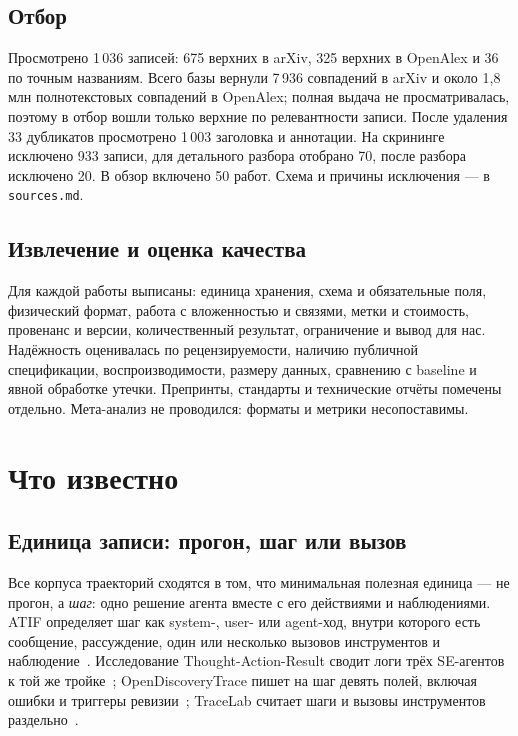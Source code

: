 \documentclass[11pt,a4paper]{article}
\begin{document}
\subsection{Отбор}

Просмотрено 1\,036 записей: 675 верхних в arXiv, 325 верхних в OpenAlex и
36 по точным названиям. Всего базы вернули 7\,936 совпадений в arXiv и
около 1,8 млн полнотекстовых совпадений в OpenAlex; полная выдача не
просматривалась, поэтому в отбор вошли только верхние по релевантности
записи. После удаления 33 дубликатов просмотрено 1\,003 заголовка и
аннотации. На скрининге исключено 933 записи, для детального разбора
отобрано 70, после разбора исключено 20. В обзор включено 50 работ. Схема
и причины исключения — в \texttt{sources.md}.

\subsection{Извлечение и оценка качества}

Для каждой работы выписаны: единица хранения, схема и обязательные поля,
физический формат, работа с вложенностью и связями, метки и стоимость,
провенанс и версии, количественный результат, ограничение и вывод для нас.
Надёжность оценивалась по рецензируемости, наличию публичной спецификации,
воспроизводимости, размеру данных, сравнению с baseline и явной обработке
утечки. Препринты, стандарты и технические отчёты помечены отдельно.
Мета-анализ не проводился: форматы и метрики несопоставимы.

\section{Что известно}

\subsection{Единица записи: прогон, шаг или вызов}

Все корпуса траекторий сходятся в том, что минимальная полезная единица —
не прогон, а \emph{шаг}: одно решение агента вместе с его действиями и
наблюдениями. ATIF определяет шаг как system-, user- или agent-ход, внутри
которого есть сообщение, рассуждение, один или несколько вызовов
инструментов и наблюдение~\cite{atif2026}. Исследование
Thought-Action-Result сводит логи трёх SE-агентов к той же
тройке~\cite{bouzenia2025tar}; OpenDiscoveryTrace пишет на шаг девять полей,
включая ошибки и триггеры ревизии~\cite{bansal2026odt}; TraceLab считает
шаги и вызовы инструментов раздельно~\cite{zhu2026tracelab}.
\end{document}
